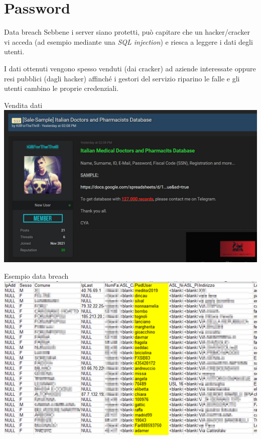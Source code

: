 
\section{Password}

\begin{myframe}{Data breach}
  Sebbene i server siano protetti, può capitare che un hacker/cracker vi acceda (ad esempio mediante una \emph{SQL injection}) e riesca a leggere i dati degli utenti.

  \pause\medskip
  I dati ottenuti vengono spesso venduti (dai cracker) ad aziende interessate oppure resi pubblici (dagli hacker) affinché i gestori del servizio riparino le falle e gli utenti cambino le proprie credenziali.
\end{myframe}

\begin{myframe}{Vendita dati}
    \includegraphics[width=.9\textwidth]{img/venditadati}
\end{myframe}
\begin{myframe}{Esempio data breach}
    \includegraphics[width=.9\textwidth]{img/databreach}
\end{myframe}

